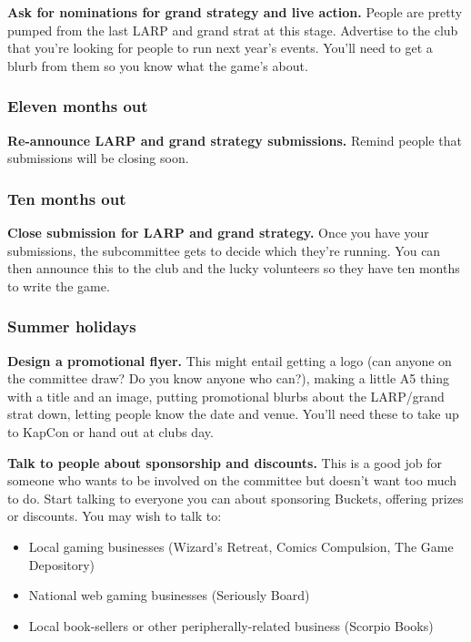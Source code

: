 \textbf{Ask for nominations for grand strategy and live action.} People are pretty pumped from the last LARP and grand strat at this stage. Advertise to the club that you're looking for people to run next year's events. You'll need to get a blurb from them so you know what the game's about.

\subsubsection{Eleven months out}

\textbf{Re-announce LARP and grand strategy submissions.} Remind people that submissions will be closing soon.

\subsubsection{Ten months out}

\textbf{Close submission for LARP and grand strategy.} Once you have your submissions, the subcommittee gets to decide which they're running. You can then announce this to the club and the lucky volunteers so they have ten months to write the game.

\subsubsection{Summer holidays}

\textbf{Design a promotional flyer.} This might entail getting a logo (can anyone on the committee draw? Do you know anyone who can?), making a little A5 thing with a title and an image, putting promotional blurbs about the LARP/grand strat down, letting people know the date and venue. You'll need these to take up to KapCon or hand out at clubs day.

\textbf{Talk to people about sponsorship and discounts.} This is a good job for someone who wants to be involved on the committee but doesn't want too much to do. Start talking to everyone you can about sponsoring Buckets, offering prizes or discounts. You may wish to talk to:

\begin{itemize}
  \item Local gaming businesses (\eg Wizard's Retreat, Comics Compulsion, The Game Depository)
  \item National web gaming businesses (\eg Seriously Board)
  \item Local book-sellers or other peripherally-related business (\eg Scorpio Books)
\end{itemize}

